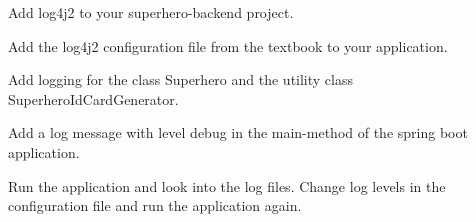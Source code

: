 \begin{oefening}

\begin{todolist}
\item Add log4j2 to your superhero-backend project.
\item Add the log4j2 configuration file from the textbook to your application. 
\item Add logging for the class Superhero and the utility class SuperheroIdCardGenerator.
\item Add a log message with level debug in the main-method of the spring boot application.
\item Run the application and look into the log files. Change log levels in the configuration file and run the application again.
\end{todolist}
\end{oefening}